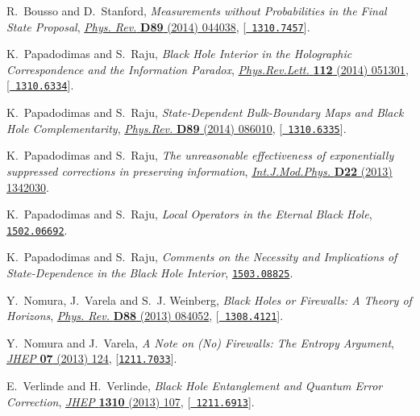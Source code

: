 \documentclass[10pt]{article}
\begin{document}
\begin{thebibliography}{100}
R.~Bousso and D.~Stanford, \emph{{Measurements without Probabilities in the
  Final State Proposal}},
  \href{http://dx.doi.org/10.1103/PhysRevD.89.044038}{\emph{Phys. Rev.} {\bf
  D89} (2014) 044038}, [\href{http://arxiv.org/abs/1310.7457}{{\tt
  1310.7457}}].

K.~Papadodimas and S.~Raju, \emph{{Black Hole Interior in the Holographic
  Correspondence and the Information Paradox}},
  \href{http://dx.doi.org/10.1103/PhysRevLett.112.051301}{\emph{Phys.Rev.Lett.}
  {\bf 112} (2014) 051301}, [\href{http://arxiv.org/abs/1310.6334}{{\tt
  1310.6334}}].

K.~Papadodimas and S.~Raju, \emph{{State-Dependent Bulk-Boundary Maps and Black
  Hole Complementarity}},
  \href{http://dx.doi.org/10.1103/PhysRevD.89.086010}{\emph{Phys.Rev.} {\bf
  D89} (2014) 086010}, [\href{http://arxiv.org/abs/1310.6335}{{\tt
  1310.6335}}].

K.~Papadodimas and S.~Raju, \emph{{The unreasonable effectiveness of
  exponentially suppressed corrections in preserving information}},
  \href{http://dx.doi.org/10.1142/S0218271813420303}{\emph{Int.J.Mod.Phys.}
  {\bf D22} (2013) 1342030}.

K.~Papadodimas and S.~Raju, \emph{{Local Operators in the Eternal Black Hole}},
   \href{http://arxiv.org/abs/1502.06692}{{\tt 1502.06692}}.

K.~Papadodimas and S.~Raju, \emph{{Comments on the Necessity and Implications
  of State-Dependence in the Black Hole Interior}},
  \href{http://arxiv.org/abs/1503.08825}{{\tt 1503.08825}}.

Y.~Nomura, J.~Varela and S.~J. Weinberg, \emph{{Black Holes or Firewalls: A
  Theory of Horizons}},
  \href{http://dx.doi.org/10.1103/PhysRevD.88.084052}{\emph{Phys. Rev.} {\bf
  D88} (2013) 084052}, [\href{http://arxiv.org/abs/1308.4121}{{\tt
  1308.4121}}].

Y.~Nomura and J.~Varela, \emph{{A Note on (No) Firewalls: The Entropy
  Argument}}, \href{http://dx.doi.org/10.1007/JHEP07(2013)124}{\emph{JHEP} {\bf
  07} (2013) 124}, [\href{http://arxiv.org/abs/1211.7033}{{\tt 1211.7033}}].

E.~Verlinde and H.~Verlinde, \emph{{Black Hole Entanglement and Quantum Error
  Correction}}, \href{http://dx.doi.org/10.1007/JHEP10(2013)107}{\emph{JHEP}
  {\bf 1310} (2013) 107}, [\href{http://arxiv.org/abs/1211.6913}{{\tt
  1211.6913}}].


\end{thebibliography}
\end{document}
